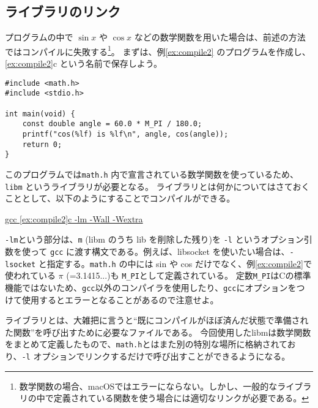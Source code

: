 \subsection{ライブラリのリンク}
プログラムの中で \(\sin x\) や \(\cos x\) などの数学関数を用いた場合は、前述の方法ではコンパイルに失敗する\footnote{数学関数の場合、macOSではエラーにならない。しかし、一般的なライブラリの中で定義されている関数を使う場合には適切なリンクが必要である。}。
まずは、例\ref{ex:compile2} のプログラムを作成し、\ref{ex:compile2}c という名前で保存しよう。
\begin{reidai}\label{ex:compile2}
    \begin{verbatim}
#include <math.h>
#include <stdio.h>

int main(void) {
    const double angle = 60.0 * M_PI / 180.0;
    printf("cos(%lf) is %lf\n", angle, cos(angle));
    return 0;
}
\end{verbatim}
\end{reidai} \noindent
このプログラムでは\texttt{math.h} 内で宣言されている数学関数を使っているため、\texttt{libm} というライブラリが必要となる。
ライブラリとは何かについてはさておくこととして、以下のようにすることでコンパイルができる。
\begin{commandline2}
    \prompt \underline{gcc \ref{ex:compile2}c -lm -Wall -Wextra}
\end{commandline2} \noindent
\texttt{-lm}という部分は、\texttt{m} (libm のうち lib を削除した残り)を \texttt{-l} というオプション引数を使って \texttt{gcc} に渡す構文である。例えば、libsocket を使いたい場合は、\texttt{-lsocket} と指定する。\texttt{math.h} の中には sin や cos だけでなく、例\ref{ex:compile2}で使われている \(\pi\) (=3.1415...)も \texttt{M\_PI}として定義されている。
定数\texttt{M\_PI}はCの標準機能ではないため、\texttt{gcc}以外のコンパイラを使用したり、\texttt{gcc}にオプションをつけて使用するとエラーとなることがあるので注意せよ。

ライブラリとは、大雑把に言うと``既にコンパイルがほぼ済んだ状態で準備された関数''を呼び出すために必要なファイルである。
今回使用したlibmは数学関数をまとめて定義したもので、\texttt{math.h}とはまた別の特別な場所に格納されており、\texttt{-l} オプションでリンクするだけで呼び出すことができるようになる。

